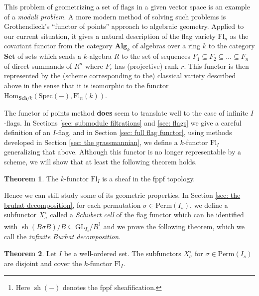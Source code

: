 \documentclass[oneside,11pt]{amsart}
\newcommand{\bSet}{\ensuremath{\textbf{Set}}}
\newcommand{\bAlg}{\ensuremath{\textbf{Alg}}}
\newcommand{\bSch}{\ensuremath{\textbf{Sch}}}
\newcommand{\Hom}{\ensuremath{\text{Hom}}}
\newcommand{\GL}{\ensuremath{\text{GL}}}
\newcommand{\Fl}{\ensuremath{\text{Fl}}}
\newcommand{\Perm}{\ensuremath{\text{Perm}}}
\newcommand{\Spec}{\ensuremath{\text{Spec}}}
\newcommand{\sh}{\operatorname{sh}}
\theoremstyle{definition}
\newtheorem{proof techniques}{Proof Techniques}
\newtheorem*{theorem*}{Theorem}
\begin{document}
This problem of geometrizing a set of flags in a given vector space is an example of a \emph{moduli problem}. A more modern method of solving such problems is Grothendieck's ``functor of points'' approach to algebraic geometry. Applied to our current situation, it gives a natural description of the flag variety $\Fl_n$ as the covariant functor from the category $\bAlg_k$ of algebras over a ring $k$ to the category $\bSet$ of sets which sends a $k$-algebra $R$ to the set of sequences $F_1 \subseteq F_2 \subseteq \ldots \subseteq F_n$ of direct summands of $R^n$ where $F_r$ has (projective) rank $r$. This functor is then represented by the (scheme corresponding to the) classical variety described above in the sense that it is isomorphic to the functor $\Hom_{\bSch/k}(\Spec(-) , \Fl_n(k) )$. 

The functor of points method \textbf{does} seem to translate well to the case of infinite $I$-flags. In Sections \ref{sec: submodule filtrations} and \ref{sec: flags} we give a careful definition of an $I$-flag, and in Section \ref{sec: full flag functor}, using methods developed in Section \ref{sec: the grassmannian}, we define a $k$-functor $\Fl_I$ generalizing that above. Although this functor is no longer representable by a scheme, we will show that at least the following theorem holds. 

\begin{theorem*}
The $k$-functor $\Fl_I$ is a sheaf in the fppf topology. 
\end{theorem*}

Hence we can still study some of its geometric properties. In Section \ref{sec: the bruhat decomposition}, for each permutation $\sigma \in \Perm(I_s)$, we define a subfunctor $X_\sigma^\circ$ called a \emph{Schubert cell} of the flag functor which can be identified with $\sh(B \sigma B) / B \subseteq \GL_{I_s} / B$\footnote{Here $\sh( - )$ denotes the fppf sheafification.} and we prove the following theorem, which we call the \emph{infinite Burhat decomposition}.

\begin{theorem*}
Let $I$ be a well-ordered set. The subfunctors $X^\circ_\sigma$ for $\sigma \in \Perm(I_s)$ are disjoint and cover the $k$-functor $\Fl_I$. 
\end{theorem*}
\end{document}

